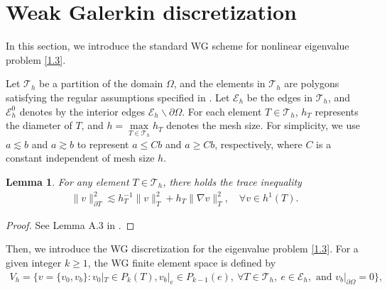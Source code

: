 \documentclass[10pt,a4paper]{amsart}
\numberwithin{equation}{section}
\newtheorem{lemma}{Lemma}[section]
\newtheorem{defi}{Definition}[section]
\newcommand{\E}{\mathcal{E}}
\newcommand{\T}{{\mathcal{T}}}
\newcommand{\la}{\langle}
\newcommand{\ra}{\rangle_{\partial T}}
\begin{document}
\section{Weak Galerkin discretization}In this section, we introduce the standard WG scheme for nonlinear eigenvalue problem \eqref{1.3}.


Let $\T_h$ be a partition of the domain $\Omega$, and the elements
in $\T_h$ are polygons satisfying the regular assumptions specified
in \cite{Wang2014a}. Let $\E_h$ be the edges in $\T_h$, and
$\E_h^0$ denotes by the interior edges $\E_h \backslash\partial\Omega$. For each element $T\in\T_h$, $h_T$ represents the diameter of $T$, and $h=\max\limits_{T\in\T_h} h_T$ denotes the mesh size. For simplicity, we use $a\lesssim b$  and $a\gtrsim b$ to represent $a\le Cb$ and $a\ge Cb$, respectively, where $C$ is a constant independent of mesh size $h$.

\begin{lemma}
	For any element  $T\in\T_h$, there holds the trace inequality
	\begin{eqnarray}\label{trace}
		\|v\|_{\partial T}^2\lesssim h_T^{-1}\|v\|_T^2+h_T\|\nabla v\|_T^2,\quad\forall v\in h^1(T).
	\end{eqnarray}
\end{lemma}
\begin{proof}
	See Lemma A.3 in \cite{Wang2014a}.
\end{proof}


Then, we introduce the WG discretization for the eigenvalue problem \eqref{1.3}. For a given integer $k\ge1$, the WG finite element space is defined by
\begin{eqnarray*}
	V_h= \big\{ v=\{ v_0, v_b\}: v_0|_T\in  P_k(T),  v_b|_e\in  P_{k-1}(e),\ \forall T\in\T_h,\ e\in\E_h,\text{ and }  v_b|_{\partial\Omega}= 0\big\},
\end{eqnarray*}

	
\end{document}
